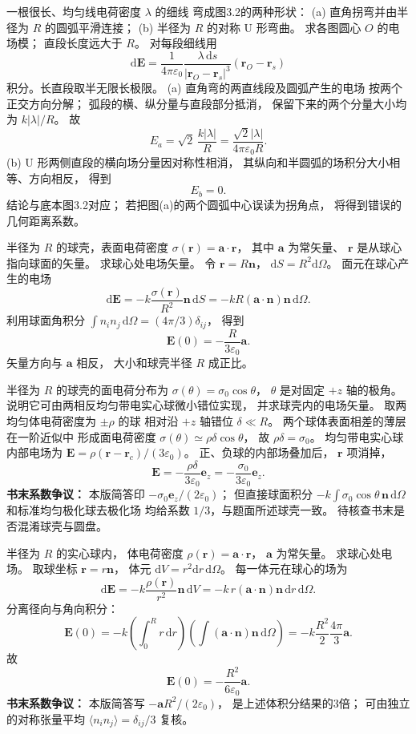 一根很长、均匀线电荷密度 $\lambda$ 的细线
弯成图3.2的两种形状：
(a) 直角拐弯并由半径为 $R$ 的圆弧平滑连接；
(b) 半径为 $R$ 的对称 U 形弯曲。
求各图圆心 $O$ 的电场模；
直段长度远大于 $R$。
\exsolution
对每段细线用
\[
\mathrm d\bm E
=\frac{1}{4\pi\varepsilon_0}
\frac{\lambda\,\mathrm ds}{|\bm r_O-\bm r_s|^3}
(\bm r_O-\bm r_s)
\]
积分。长直段取半无限长极限。
(a) 直角弯的两直线段及圆弧产生的电场
按两个正交方向分解；
弧段的横、纵分量与直段部分抵消，
保留下来的两个分量大小均为 $k|\lambda|/R$。
故
\[
\boxed{E_a=\sqrt2\,\frac{k|\lambda|}{R}
=\frac{\sqrt2|\lambda|}{4\pi\varepsilon_0R}}.
\]
(b) U 形两侧直段的横向场分量因对称性相消，
其纵向和半圆弧的场积分大小相等、方向相反，
得到
\[
\boxed{E_b=0}.
\]
\excheck 结论与底本图3.2对应；
若把图(a)的两个圆弧中心误读为拐角点，
将得到错误的几何距离系数。

半径为 $R$ 的球壳，表面电荷密度
$\sigma(\bm r)=\bm a\cdot\bm r$，
其中 $\bm a$ 为常矢量、
$\bm r$ 是从球心指向球面的矢量。
求球心处电场矢量。
\exsolution
令 $\bm r=R\bm n$，
$\mathrm dS=R^2\mathrm d\Omega$。
面元在球心产生的电场
\[
\mathrm d\bm E
=-k\frac{\sigma(\bm r)}{R^2}\bm n\,\mathrm dS
=-kR(\bm a\cdot\bm n)\bm n\,\mathrm d\Omega.
\]
利用球面角积分
$\int n_i n_j\,\mathrm d\Omega
=(4\pi/3)\delta_{ij}$，
得到
\[
\boxed{\bm E(0)=
-\frac{R}{3\varepsilon_0}\bm a}.
\]
\excheck 矢量方向与 $\bm a$ 相反，
大小和球壳半径 $R$ 成正比。

半径为 $R$ 的球壳的面电荷分布为
$\sigma(\theta)=\sigma_0\cos\theta$，
$\theta$ 是对固定 $+z$ 轴的极角。
说明它可由两相反均匀带电实心球微小错位实现，
并求球壳内的电场矢量。
\exsolution
取两均匀体电荷密度为 $\pm\rho$ 的球
相对沿 $+z$ 轴错位 $\delta\ll R$。
两个球体表面相差的薄层在一阶近似中
形成面电荷密度
$\sigma(\theta)\simeq\rho\delta\cos\theta$，
故 $\rho\delta=\sigma_0$。
均匀带电实心球内部电场为
$\bm E=\rho(\bm r-\bm r_c)/(3\varepsilon_0)$。
正、负球的内部场叠加后，
$\bm r$ 项消掉，
\[
\bm E=
-\frac{\rho\delta}{3\varepsilon_0}\bm e_z
=\boxed{-\frac{\sigma_0}{3\varepsilon_0}\bm e_z}.
\]
\excheck \textbf{书末系数争议：}
本版简答印 $-\sigma_0\bm e_z/(2\varepsilon_0)$；
但直接球面积分
$-k\int\sigma_0\cos\theta\,\bm n\,\mathrm d\Omega$
和标准均匀极化球去极化场
均给系数 $1/3$，与题面所述球壳一致。
待核查书末是否混淆球壳与圆盘。

半径为 $R$ 的实心球内，
体电荷密度
$\rho(\bm r)=\bm a\cdot\bm r$，
$\bm a$ 为常矢量。
求球心处电场。
\exsolution
取球坐标
$\bm r=r\bm n$，
体元
$\mathrm dV=r^2\mathrm dr\,\mathrm d\Omega$。
每一体元在球心的场为
\[
\mathrm d\bm E
=-k\frac{\rho(\bm r)}{r^2}\bm n\,\mathrm dV
=-k\,r(\bm a\cdot\bm n)\bm n\,
\mathrm dr\,\mathrm d\Omega.
\]
分离径向与角向积分：
\[
\bm E(0)
=-k\left(\int_0^Rr\,\mathrm dr\right)
\left(\int(\bm a\cdot\bm n)\bm n\,\mathrm d\Omega\right)
=-k\frac{R^2}{2}\frac{4\pi}{3}\bm a.
\]
故
\[
\boxed{\bm E(0)=
-\frac{R^2}{6\varepsilon_0}\bm a}.
\]
\excheck \textbf{书末系数争议：}
本版简答写 $-\bm aR^2/(2\varepsilon_0)$，
是上述体积分结果的3倍；
可由独立的对称张量平均
$\langle n_i n_j\rangle=\delta_{ij}/3$ 复核。

